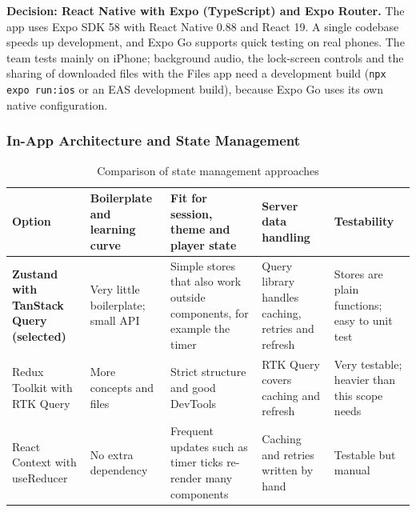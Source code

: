 \endgroup

\noindent\textbf{Decision: React Native with Expo (TypeScript) and Expo Router.} The app uses Expo SDK 58 with React Native 0.88 and React 19. A single codebase speeds up development, and Expo Go supports quick testing on real phones. The team tests mainly on iPhone; background audio, the lock-screen controls and the sharing of downloaded files with the Files app need a development build (\texttt{npx expo run:ios} or an EAS development build), because Expo Go uses its own native configuration.


\subsubsection{In-App Architecture and State Management}

\begingroup

\footnotesize

\begin{longtable}{|>{\raggedright\arraybackslash}p{2.6cm}|>{\raggedright\arraybackslash}p{2.95cm}|>{\raggedright\arraybackslash}p{2.95cm}|>{\raggedright\arraybackslash}p{2.95cm}|>{\raggedright\arraybackslash}p{2.95cm}|}

\caption{Comparison of state management approaches}\label{tab:tech-state}\\

\hline

\textbf{Option} & \textbf{Boilerplate and learning curve} & \textbf{Fit for session, theme and player state} & \textbf{Server data handling} & \textbf{Testability} \\ \hline

\textbf{Zustand with TanStack Query (selected)} & Very little boilerplate; small API &

Simple stores that also work outside components, for example the timer &

Query library handles caching, retries and refresh &

Stores are plain functions; easy to unit test \\ \hline

Redux Toolkit with RTK Query & More concepts and files &

Strict structure and good DevTools &

RTK Query covers caching and refresh &

Very testable; heavier than this scope needs \\ \hline

React Context with useReducer & No extra dependency &

Frequent updates such as timer ticks re-render many components &

Caching and retries written by hand &

Testable but manual \\ \hline

\end{longtable}

